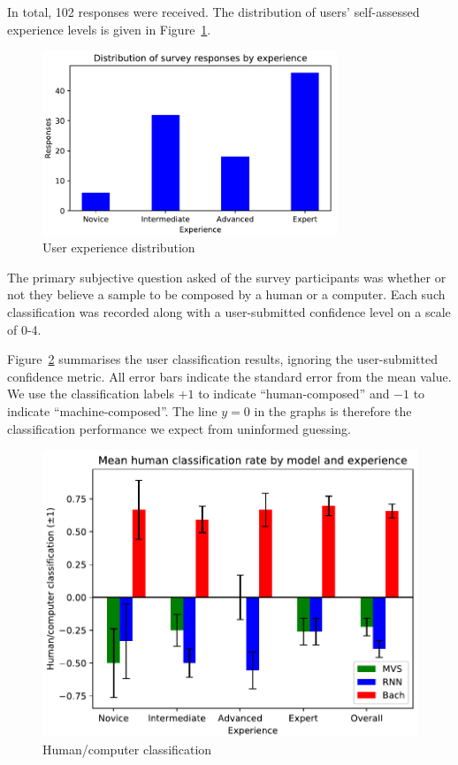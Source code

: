 \documentclass[12pt,a4paper,twoside,openright]{report}
\begin{document}
In total, 102 responses were received. The distribution of users' self-assessed
experience levels is given in Figure~\ref{fig:response-dist}.

\begin{figure}[H]
\centering
\includegraphics[width=250pt]{figs/response_dist.pdf}
\caption{User experience distribution}
\label{fig:response-dist}
\end{figure}

The primary subjective question asked of the survey participants was whether or
not they believe a sample to be composed by a human or a computer. Each such
classification was recorded along with a user-submitted confidence level on a
scale of 0-4.

Figure~\ref{fig:human-classification} summarises the user classification
results, ignoring the user-submitted confidence metric. All error bars indicate
the standard error from the mean value. We use the classification labels $+1$ to
indicate ``human-composed'' and $-1$ to indicate ``machine-composed''. The line
$y = 0$ in the graphs is therefore the classification performance we expect from
uninformed guessing.

\begin{figure}[H]
\centering
\includegraphics[width=340pt]{figs/human_classification.pdf}
\caption{Human/computer classification}
\label{fig:human-classification}
\end{figure}
\end{document}
